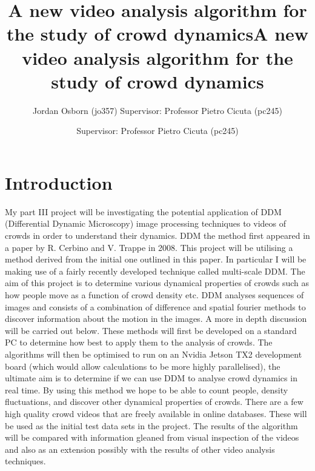 \documentclass[11pt]{article}
\title{A new video analysis algorithm for the study of crowd dynamics}
\author{Jordan Osborn (jo357) Supervisor: Professor Pietro Cicuta (pc245)}
\begin{document}
\begin{titlingpage}
    \maketitle
\end{titlingpage}
\clearpage

\title{A new video analysis algorithm for the study of crowd dynamics}
\author{Supervisor: Professor Pietro Cicuta (pc245)}
\maketitle

\section{Introduction}
My part III project will be investigating the potential application of DDM (Differential Dynamic Microscopy) image processing techniques to videos of crowds in order to understand their dynamics.
DDM the method first appeared in a paper by R. Cerbino and V. Trappe in 2008.\cite{ddm0}
This project will be utilising a method derived from the initial one outlined in this paper.
In particular I will be making use of a fairly recently developed technique called multi-scale DDM.\cite{ddm1}
The aim of this project is to determine various dynamical properties of crowds such as how people move as a function of crowd density etc.
DDM analyses sequences of images and consists of a combination of difference and spatial fourier methods to discover information about the motion in the images.
A more in depth discussion will be carried out below.
These methods will first be developed on a standard PC to determine how best to apply them to the analysis of crowds.
The algorithms will then be optimised to run on an Nvidia Jetson TX2 development board (which would allow calculations to be more highly parallelised), the ultimate aim is to determine if we can use DDM to analyse crowd dynamics in real time.
By using this method we hope to be able to count people, density fluctuations, and discover other dynamical properties of crowds.
There are a few high quality crowd videos that are freely available in online databases.\cite{crowdMotionDB}
These will be used as the initial test data sets in the project.
The results of the algorithm will be compared with information gleaned from visual inspection of the videos and also as an extension possibly with the results of other video analysis techniques.
\\
\end{document}
